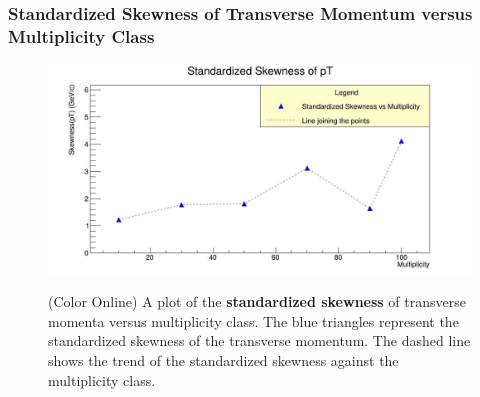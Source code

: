 \documentclass[letterpaper,aps,prc,superscriptaddress,nofootinbib,10pt,showpacs,floatfix]{revtex4-2}%
\begin{document}
\subsubsection{Standardized Skewness of Transverse Momentum versus Multiplicity Class}
\label{subsubsec:stdskew}
\vspace{-5mm}
\begin{figure}[!htb]
\begin{minipage}{\textwidth}
   \label{Fig:8}
     \centering
     \renewcommand{\thefigure}{8}
     \includegraphics[width=\linewidth]{stdskew}
     \begin{minipage}{0.8\textwidth}
     \caption{(Color Online) A plot of the \textbf{standardized skewness} of transverse momenta versus multiplicity class. The blue triangles represent the standardized skewness of the transverse momentum. The dashed line shows the trend of the standardized skewness against the multiplicity class.}
     \end{minipage}     
\end{minipage}
\end{figure}

\FloatBarrier
\vspace{-1mm}
\end{document}
